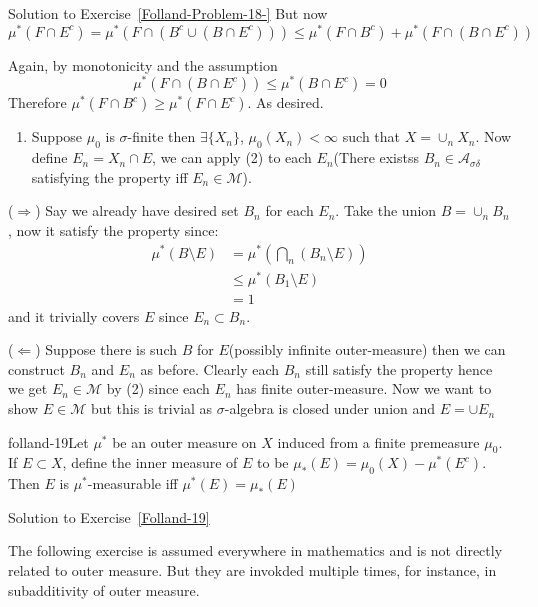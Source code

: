 \begin{mystsolution}{Solution to Exercise~\ref{Folland-Problem-18-}}
But now
\begin{equation}
\mu^*(F\cap E^c) = \mu^*(F\cap (B^c \cup (B\cap E^c))) \leq \mu^*(F\cap B^c)  + \mu^*(F\cap (B\cap E^c))
\end{equation}

Again, by monotonicity and the assumption
\begin{equation}
\mu^*(F\cap (B\cap E^c))\leq \mu^*(B\cap E^c) = 0
\end{equation}
Therefore
$\mu^*(F \cap B^c) \geq  \mu^*(F\cap E^c)$. As desired.

\begin{enumerate}[resume]
\item Suppose $\mu_0$ is $\sigma$-finite then $\exists \{X_n\}$, $\mu_0(X_n)<\infty$ such that $X = \cup_n X_n$. Now define $E_n= X_n\cap E$, we can apply (2) to each $E_n$(There existss $B_n\in \mathcal A_{\sigma\delta}$ satisfying the property iff $E_n\in \mathcal M$).
\end{enumerate}

($\Longrightarrow$)  Say we already have desired set $B_n$ for each $E_n$. Take the union $B=\cup_n B_n$, now it satisfy the property since:
\begin{equation}
\begin{aligned}
\mu^*(B\setminus E) &=\mu^*(\bigcap_n (B_n \setminus E))  \\
&\leq \mu^*(B_1\setminus E) \\
&=1
\end{aligned}
\end{equation}
and it trivially covers $E$ since $E_n \subset B_n$.

($\Longleftarrow$) Suppose there is such $B$ for $E$(possibly infinite outer-measure) then we can construct $B_n$ and $E_n$ as before. Clearly each $B_n$ still satisfy the property hence we get $E_n \in \mathcal M$ by (2) since each $E_n$ has finite outer-measure. Now we want to show $E \in \mathcal M$ but this is trivial as $\sigma$-algebra is closed under union and $E= \cup E_n$

\end{mystsolution}
\begin{mystexercise}{}{folland-19}\label{Folland-19}\label{folland-19}Let $\mu^*$ be an outer measure on $X$ induced from a finite premeasure $\mu_0$. If $E \subset X$, define the inner measure of $E$ to be $\mu_*(E) = \mu_0(X) - \mu^*(E^c)$. Then $E$ is $\mu^*$-measurable iff $\mu^*(E) = \mu_*(E)$

\end{mystexercise}
\begin{mystsolution}{Solution to Exercise~\ref{Folland-19}}\end{mystsolution}
The following exercise is assumed everywhere in mathematics and is not directly related to outer measure. But they are invokded multiple times, for instance, in subadditivity of outer measure.

